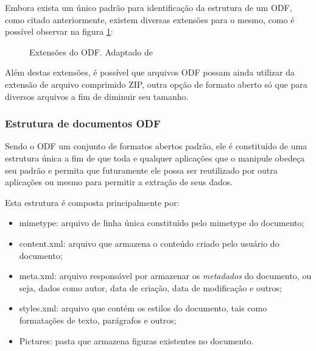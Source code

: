Embora exista um único padrão para identificação da estrutura de um ODF, como citado anteriormente, existem diversas extensões para o mesmo, como é possível observar na figura \ref{extensoes_odf}:

\begin{figure}[ht]
    \centering
    \caption{Extensões do ODF. Adaptado de \cite{WIKIPEDIA-ODF}}
    \label{extensoes_odf}
\end{figure}

Além destas extensões, é possível que arquivos ODF possam ainda utilizar da extensão de arquivo comprimido ZIP, outra opção de formato aberto só que para diversos arquivos a fim de diminuir seu tamanho.

\subsubsection{Estrutura de documentos ODF}

Sendo o ODF um conjunto de formatos abertos padrão, ele é constituído de uma estrutura única a fim de que toda e qualquer aplicações que o manipule obedeça seu padrão e permita que futuramente ele possa ser reutilizado por outra aplicações ou mesmo para permitir a extração de seus dados.

Esta estrutura é composta principalmente por:

\begin{itemize}
    \item{mimetype: arquivo de linha única constituído pelo mimetype do documento;}
    \item{content.xml: arquivo que armazena o conteúdo criado pelo usuário do documento;}
    \item{meta.xml: arquivo responsável por armazenar os \textit{metadados} do documento, ou seja, dados como autor, data de criação, data de modificação e outros;}
    \item{styles.xml: arquivo que contém os estilos do documento, tais como formatações de texto, parágrafos e outros;}
    \item{Pictures: pasta que armazena figuras existentes no documento.}
\end{itemize}

